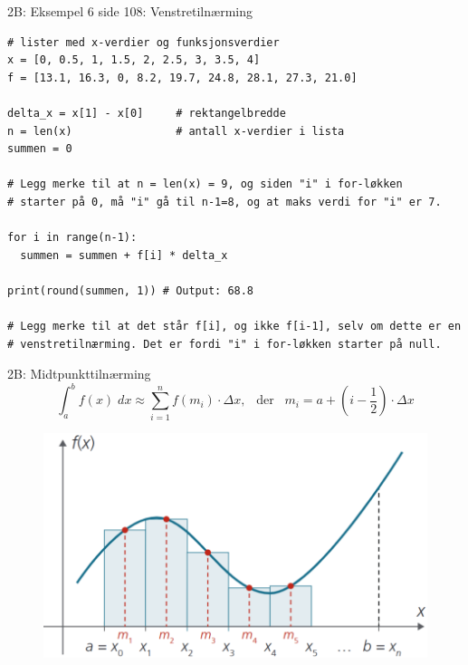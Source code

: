 \greenheader
\begin{frame}[fragile]{2B: Eksempel 6 side 108: Venstretilnærming}
\begin{verbatim}
# lister med x-verdier og funksjonsverdier
x = [0, 0.5, 1, 1.5, 2, 2.5, 3, 3.5, 4]
f = [13.1, 16.3, 0, 8.2, 19.7, 24.8, 28.1, 27.3, 21.0]

delta_x = x[1] - x[0]     # rektangelbredde
n = len(x)                # antall x-verdier i lista
summen = 0

# Legg merke til at n = len(x) = 9, og siden "i" i for-løkken 
# starter på 0, må "i" gå til n-1=8, og at maks verdi for "i" er 7.

for i in range(n-1):    
  summen = summen + f[i] * delta_x

print(round(summen, 1)) # Output: 68.8

# Legg merke til at det står f[i], og ikke f[i-1], selv om dette er en 
# venstretilnærming. Det er fordi "i" i for-løkken starter på null. 
\end{verbatim}
\end{frame}




\redheader
\begin{frame}{2B: Midtpunkttilnærming}
 \begin{equation*}
        \int_a^b f(x)\;dx\approx\sum_{i=1}^nf(m_{i})\cdot \Delta x, \:\;\; \text{der} \;\;\; m_{i}=a+\left(i-\frac{1}{2}\right)\cdot \Delta x
    \end{equation*}

     \begin{figure}
        \centering
   \includegraphics[width=0.7\linewidth]{R2-K2B-5.png}
    \end{figure}
\end{frame}


